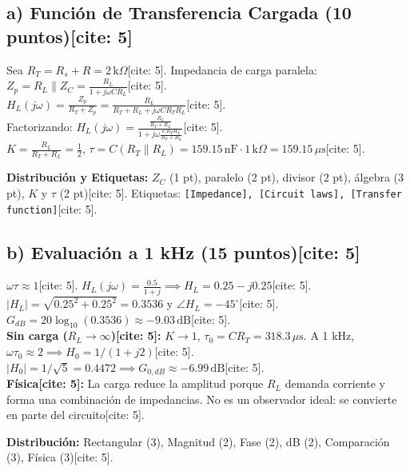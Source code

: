 \documentclass[11pt, a4paper]{article}
\begin{document}
\subsection*{a) Función de Transferencia Cargada (10 puntos)[cite: 5]}
Sea $R_T = R_s + R = 2\,\text{k}\Omega$[cite: 5]. Impedancia de carga paralela: $Z_p = R_L \parallel Z_C = \frac{R_L}{1+j\omega C R_L}$[cite: 5]. \\
$H_L(j\omega) = \frac{Z_p}{R_T + Z_p} = \frac{R_L}{R_T + R_L + j\omega C R_T R_L}$[cite: 5]. \\
Factorizando: $\boxed{H_L(j\omega) = \frac{\frac{R_L}{R_T+R_L}}{1 + j\omega \frac{C R_T R_L}{R_T+R_L}}}$[cite: 5]. \\
$\boxed{K = \frac{R_L}{R_T+R_L} = \frac{1}{2}}$, $\boxed{\tau = C(R_T \parallel R_L) = 159.15\,\text{nF} \cdot 1\,\text{k}\Omega = 159.15\,\mu\text{s}}$[cite: 5].

\textbf{Distribución y Etiquetas:} $Z_C$ (1 pt), paralelo (2 pt), divisor (2 pt), álgebra (3 pt), $K$ y $\tau$ (2 pt)[cite: 5]. Etiquetas: \texttt{[Impedance], [Circuit laws], [Transfer function]}[cite: 5].

\subsection*{b) Evaluación a 1 kHz (15 puntos)[cite: 5]}
$\omega\tau \approx 1$[cite: 5]. $H_L(j\omega) = \frac{0.5}{1+j} \implies \boxed{H_L = 0.25 - j0.25}$[cite: 5]. \\
$\boxed{|H_L| = \sqrt{0.25^2+0.25^2} = 0.3536}$ y $\boxed{\angle H_L = -45^\circ}$[cite: 5]. $\boxed{G_{dB} = 20\log_{10}(0.3536) \approx -9.03\,\text{dB}}$[cite: 5]. \\
\textbf{Sin carga ($R_L \rightarrow \infty$)[cite: 5]:} $K \rightarrow 1$, $\tau_0 = CR_T = 318.3\,\mu\text{s}$. A 1 kHz, $\omega\tau_0 \approx 2 \implies H_0 = 1 / (1+j2)$[cite: 5]. $|H_0| = 1/\sqrt{5} = 0.4472 \implies G_{0,dB} \approx -6.99\,\text{dB}$[cite: 5]. \\
\textbf{Física[cite: 5]:} La carga reduce la amplitud porque $R_L$ demanda corriente y forma una combinación de impedancias. No es un observador ideal: se convierte en parte del circuito[cite: 5].

\textbf{Distribución:} Rectangular (3), Magnitud (2), Fase (2), dB (2), Comparación (3), Física (3)[cite: 5].
\end{document}
